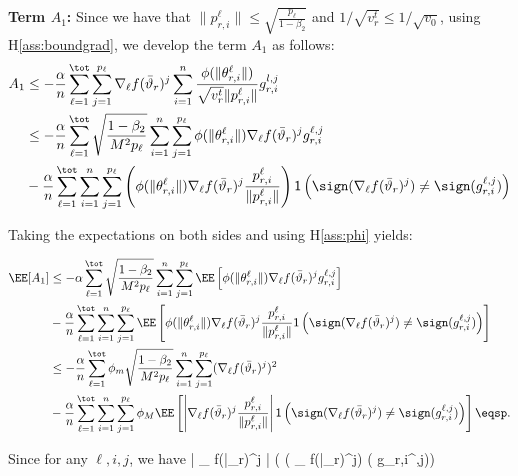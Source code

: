 \documentclass[11pt]{article}
\begin{document}
\textbf{ Term $A_1$:}
Since we have that $\|p_{r,i}^{\ell}\| \leq \sqrt{\frac{p_\ell}{1-\beta_2}}$ and $1/\sqrt{v^{t}_{r}} \leq 1/\sqrt{v_{0}}$, using H\ref{ass:boundgrad}, we develop the term $A_1$ as follows:
\begin{align}\notag
A_1 & \leq - \frac{\alpha}{n} \sum_{\ell=1}^\tot \sum_{j=1}^{p_\ell} \nabla_{\ell} f(\bar{\vartheta}_r)^j  \sum_{i = 1}^n \frac{\phi(\|\theta_{r,i}^{\ell}\|)}{\sqrt{v^{t}_{r}} \|p_{r,i}^{\ell}\|} g_{r,i}^{l,j}\\\notag
& \leq - \frac{\alpha}{n} \sum_{\ell=1}^\tot  \sqrt{\frac{1-\beta_2}{M^2 p_\ell}} \sum_{i = 1}^n \sum_{j=1}^{p_\ell}   \phi(\|\theta_{r,i}^{\ell}\|)  \nabla_{\ell} f(\bar{\vartheta}_r)^j  g^{\ell, j}_{r,i}\\\notag
& - \frac{\alpha}{n} \sum_{\ell=1}^\tot \sum_{i = 1}^n \sum_{j=1}^{p_\ell}   \left( \phi(\|\theta_{r,i}^{\ell}\|)  \nabla_{\ell} f(\bar{\vartheta}_r)^j  \frac{p_{r,i}^{\ell}}{ \|p_{r,i}^{\ell}\|}\right)\mathsf{1}\left( \sign(  \nabla_{\ell} f(\bar{\vartheta}_r)^j) \neq  \sign( g_{r,i}^{\ell,j}) \right)
\end{align}

Taking the expectations on both sides and using H\ref{ass:phi} yields:

\begin{align}\notag
\EE[A_1]  & \leq - \alpha \sum_{\ell=1}^\tot  \sqrt{\frac{1-\beta_2}{M^2 p_\ell}} \sum_{i = 1}^n \sum_{j=1}^{p_\ell} \EE \left[  \phi(\|\theta_{r,i}^{\ell}\|)  \nabla_{\ell} f(\bar{\vartheta}_r)^j  g^{\ell, j}_{r,i}\right]\\\notag
& - \frac{\alpha}{n} \sum_{\ell=1}^\tot \sum_{i = 1}^n \sum_{j=1}^{p_\ell}   \EE\left[ \phi(\|\theta_{r,i}^{\ell}\|)  \nabla_{\ell} f(\bar{\vartheta}_r)^j  \frac{p_{r,i}^{\ell}}{ \|p_{r,i}^{\ell}\|}\mathsf{1} \left( \sign(  \nabla_{\ell} f(\bar{\vartheta}_r)^j) \neq  \sign( g_{r,i}^{\ell,j}) \right) \right]\\\notag
& \leq - \frac{\alpha}{n} \sum_{\ell=1}^\tot  \phi_m \sqrt{\frac{1-\beta_2}{M^2 p_\ell}} \sum_{i = 1}^n \sum_{j=1}^{p_\ell}    (\nabla_{\ell} f(\bar{\vartheta}_r)^j)^2\\\notag
& - \frac{\alpha}{n} \sum_{\ell=1}^\tot \sum_{i = 1}^n \sum_{j=1}^{p_\ell} \phi_M  \EE\left[ \left| \nabla_{\ell} f(\bar{\vartheta}_r)^j  \frac{p_{r,i}^{\ell}}{ \|p_{r,i}^{\ell}\|}\right| \mathsf{1}\left( \sign(  \nabla_{\ell} f(\bar{\vartheta}_r)^j) \neq  \sign( g_{r,i}^{\ell,j})\right) \right] \eqsp.
\end{align}

Since for any $\ell, i , j$, we have
\beq\notag
  \EE{} \leq   \left| \nabla_{\ell} f(\bar{\vartheta}_r)^j \right| \left( \sign(  \nabla_{\ell} f(\bar{\vartheta}_r)^j) \neq  \sign( g_{r,i}^{\ell,j})\right) 
\eeq
\end{document}
